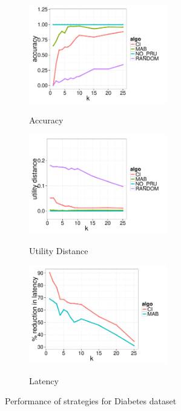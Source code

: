 \begin{figure}[t]
	\centering
	\begin{subfigure}{0.33\linewidth}
		\centering
		{\includegraphics[width=6cm] {Images/in_memory_dia_accuracy.pdf}}
		\caption{Accuracy}
		\label{fig:dia_accuracy}
	\end{subfigure}
	\begin{subfigure}{0.33\linewidth}
		\centering
		{\includegraphics[width=6cm] {Images/in_memory_dia_utility_dist.pdf}}
		\caption{Utility Distance}
		\label{fig:dia_utility_dist}
	\end{subfigure}
	\begin{subfigure}{0.33\linewidth}
		\centering
		{\includegraphics[width=6cm] {Images/in_memory_dia_latency.pdf}}
		\caption{Latency}
		\label{fig:diabetes_latency}
	\end{subfigure}
	\vspace{-10pt}
	\caption{Performance of strategies for Diabetes dataset}
	\label{fig:diabetes_perf}
	\vspace{-10pt}
\end{figure}

 
 

